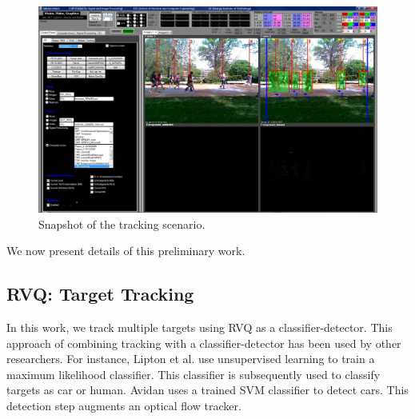 \documentclass[12pt,letterpaper,doublespaced,ETD,proposal]{gt-ece-thesis}
\begin{document}
\begin{Body}
			\begin{figure}		
					\centering		
					\includegraphics[width=1.0\textwidth]{figs/Proposal_fig3_RVQ_MTT_snapshot_VVG}
					\caption{Snapshot of the tracking scenario.}
					\label{fig:snapshot_VVG}
			\end{figure}	
			

We now present details of this preliminary work. 
			
\subsection{RVQ: Target Tracking}
In this work, we track multiple targets using RVQ as a classifier-detector.  This approach of combining tracking with a classifier-detector has been used by other researchers.  For instance, Lipton et al. \cite{1998_CNF_Tracking_Lipton} use unsupervised learning to train a maximum likelihood classifier.  This classifier is subsequently used to classify targets as car or human.  Avidan \cite{2004_JNL_SVMtracking_Avidan} uses a trained SVM classifier to detect cars.  This detection step augments an optical flow tracker. 
 

\end{Body}
\end{document}
